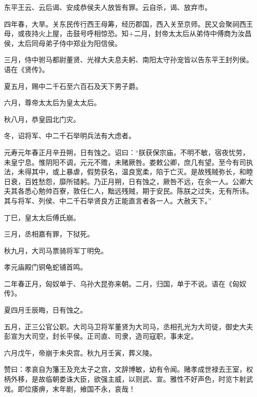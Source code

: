 \documentclass[12pt,UTF8]{ctexbook}
\begin{document}
东平王云、云后谒、安成恭侯夫人放皆有罪。云自杀，谒、放弃市。



四年春，大旱。关东民传行西王母筹，经历郡国，西入关至京师。民又会聚祠西王母，或夜持火上屋，击鼓号呼相惊恐。知+二月，封帝太太后从弟侍中傅商为汝昌侯，太后同母弟子侍中郑业为阳信侯。



三月，侍中驸马都尉董贤、光禄大夫息夫躬、南阳太守孙宠皆以告东平王封列侯。语在《贤传》。



夏五月，赐中二千石至六百石及天下男子爵。



六月，尊帝太太后为皇太太后。



秋八月，恭皇园北门灾。



冬，诏将军、中二千石举明兵法有大虑者。



元寿元年春正月辛丑朔，日有蚀之。诏曰：“朕获保宗庙，不明不敏，宿夜忧劳，未皇宁息。惟阴阳不调，元元不赡，未赌厥咎。娄敕公卿，庶几有望。至今有司执法，未得其中，或上暴虐，假势获名，温良宽柔，陷于亡灭。是故残贼弥长，和睦日衰，百姓愁怨，靡所错躬。乃正月朔，日有蚀之，厥咎不远，在余一人。公卿大夫其各悉心勉帅百寮，敦任仁人，黜远残贼，期于安民。陈朕之过失，无有所讳。其与将军、列侯、中二千石举贤良方正能直言者各一人。大赦天下。”



丁巳，皇太太后傅氏崩。



三月，丞相嘉有罪，下狱死。



秋九月，大司马票骑将军丁明免。



孝元庙殿门铜龟蛇铺首鸣。



二年春正月，匈奴单于、乌孙大昆弥来朝。二月，归国，单于不说。语在《匈奴传》。



夏四月壬辰晦，日有蚀之。



五月，正三公官公职。大司马卫将军董贤为大司马，丞相孔光为大司徒，御史大夫彭宣为大司空，封长平侯。正司直、司隶，造司寇职，事未定。



六月戊午，帝崩于未央宫。秋九月壬寅，葬义陵。



赞曰：孝哀自为籓王及充太子之宫，文辞博敏，幼有令闻。赌孝成世禄去王室，权柄外移，是故临朝娄诛大臣，欲强主威，以则武、宣。雅性不好声色，时览卞射武戏。即位痿痹，末年剧，飨国不永，哀哉！
\end{document}

